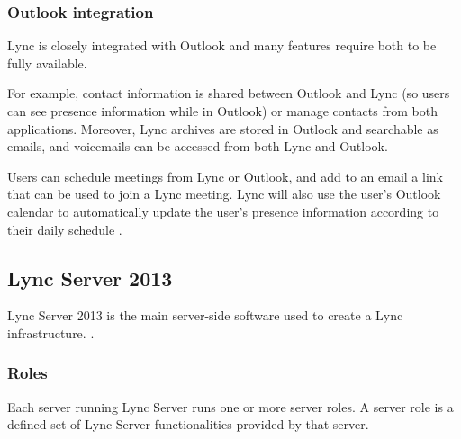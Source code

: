 \subsubsection{Outlook integration}
Lync is closely integrated with Outlook and many features require both to be fully available.

For example, contact information is shared between Outlook and Lync (so users can see presence information while in Outlook) or manage contacts from both applications. Moreover, Lync archives are stored in Outlook and searchable as emails, and voicemails can be accessed from both Lync and Outlook.

Users can schedule meetings from Lync or Outlook, and add to an email a link that can be used to join a Lync meeting. Lync will also use the user's Outlook calendar to automatically update the user's presence information according to their daily schedule
\cite{winters_mastering_2012}.


\subsection{Lync Server 2013}

Lync Server 2013 is the main server-side software used to create a Lync infrastructure\cite[Ch. 1.2]{microsoft_technet_lync_2013-2,winters_mastering_2012}.
.

\subsubsection{Roles}
Each server running Lync Server runs one or more server roles. A server role is a defined set of Lync Server functionalities provided by that server.


